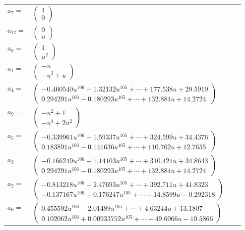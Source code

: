 \documentclass[1p]{elsarticle_modified}
\theoremstyle{definition}
\begin{document}
\begin{tabular}{m{7pt} m{180pt} m{7pt} m{180pt} }
\flushright $a_{7}=$&$\begin{pmatrix}1\\0\end{pmatrix}$ \\
\flushright $a_{12}=$&$\begin{pmatrix}0\\u\end{pmatrix}$ \\
\flushright $a_{8}=$&$\begin{pmatrix}1\\u^2\end{pmatrix}$ \\
\flushright $a_{1}=$&$\begin{pmatrix}- u\\- u^3+u\end{pmatrix}$ \\
\flushright $a_{4}=$&$\begin{pmatrix}-0.460540 u^{106}+1.32132 u^{105}+\cdots+177.538 u+20.5919\\0.294291 u^{106}-0.180293 u^{105}+\cdots+132.884 u+14.2724\end{pmatrix}$ \\
\flushright $a_{9}=$&$\begin{pmatrix}- u^2+1\\- u^4+2 u^2\end{pmatrix}$ \\
\flushright $a_{5}=$&$\begin{pmatrix}-0.339961 u^{106}+1.59337 u^{105}+\cdots+324.599 u+34.4376\\0.183891 u^{106}-0.141636 u^{105}+\cdots+110.762 u+12.7655\end{pmatrix}$ \\
\flushright $a_{3}=$&$\begin{pmatrix}-0.166249 u^{106}+1.14103 u^{105}+\cdots+310.421 u+34.8643\\0.294291 u^{106}-0.180293 u^{105}+\cdots+132.884 u+14.2724\end{pmatrix}$ \\
\flushright $a_{2}=$&$\begin{pmatrix}-0.813218 u^{106}+2.47693 u^{105}+\cdots+392.711 u+41.8323\\-0.137167 u^{106}+0.176247 u^{105}+\cdots-14.8599 u-0.292318\end{pmatrix}$ \\
\flushright $a_{6}=$&$\begin{pmatrix}0.455592 u^{106}-2.01489 u^{105}+\cdots+4.63244 u+13.1807\\0.102062 u^{106}+0.00933752 u^{105}+\cdots-49.6066 u-10.5866\end{pmatrix}$ \\

\end{tabular}
\end{document}

